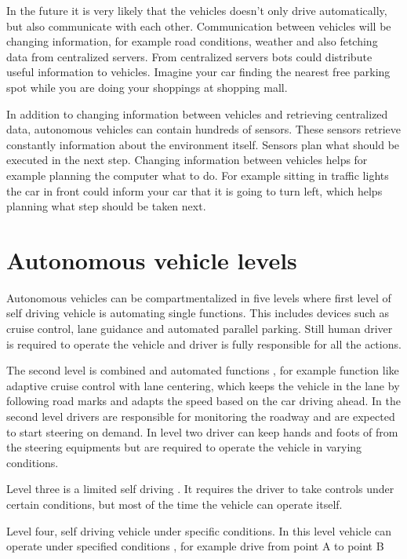 \documentclass[english]{tktltiki}
\begin{document}
In the future it is very likely that the vehicles doesn't only drive 
automatically, but also communicate with each other. \cite{trafficmodels} 
Communication between vehicles will be changing information, for example road 
conditions, weather and also fetching data from centralized servers. From 
centralized servers bots could distribute useful information to vehicles. 
Imagine your car finding the nearest free parking spot while you are doing your 
shoppings at shopping mall. 

In addition to changing information between vehicles and retrieving centralized 
data, \cite{trafficmodels} autonomous vehicles can contain hundreds of sensors. These sensors 
retrieve constantly information about the environment itself. Sensors plan what 
should be executed in the next step. Changing information between vehicles helps 
for example planning the computer what to do. For example sitting in traffic 
lights the car in front could inform your car that it is going to turn left, 
which helps planning what step should be  taken next. 

\section{Autonomous vehicle levels}

Autonomous vehicles can be compartmentalized in five levels \cite{transportpolicy} where first level of self 
driving vehicle is automating single functions. This includes devices such as 
cruise control, lane guidance and automated parallel parking. 
 Still human driver is required to operate the vehicle and 
driver is fully responsible for all the actions.

The second level is combined and automated functions \cite{transportpolicy}, for example function like 
adaptive cruise control with lane centering, which keeps the vehicle in the lane 
by following road marks and adapts the speed based on the car driving ahead. In 
the second level drivers are responsible for monitoring the roadway and are 
expected to start steering on demand. In level two driver can keep hands and 
foots of from the steering equipments but are required to operate the vehicle in 
varying conditions.

Level three is a limited self driving \cite{transportpolicy}. It requires the driver to take controls 
under certain conditions, but most of the time the vehicle can operate itself. 


Level four, self driving vehicle under specific conditions. In this level 
vehicle can operate under specified conditions \cite{transportpolicy}, for example drive from point A 
to point B
\end{document}
